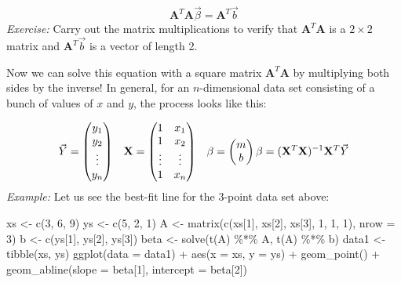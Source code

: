 \documentclass[
  letterpaper,
  DIV=11,
  numbers=noendperiod]{scrreprt}
\newenvironment{Shaded}{\begin{snugshade}}{\end{snugshade}}
\newcommand{\AttributeTok}[1]{\textcolor[rgb]{0.40,0.45,0.13}{#1}}
\newcommand{\DecValTok}[1]{\textcolor[rgb]{0.68,0.00,0.00}{#1}}
\newcommand{\FunctionTok}[1]{\textcolor[rgb]{0.28,0.35,0.67}{#1}}
\newcommand{\NormalTok}[1]{\textcolor[rgb]{0.00,0.23,0.31}{#1}}
\newcommand{\OtherTok}[1]{\textcolor[rgb]{0.00,0.23,0.31}{#1}}
\newcommand{\SpecialCharTok}[1]{\textcolor[rgb]{0.37,0.37,0.37}{#1}}
\begin{document}
\[
\mathbf{A}^T \mathbf{A} \vec \beta = \mathbf{A}^T \vec b
\] \emph{Exercise:} Carry out the matrix multiplications to verify that
\(\mathbf{A}^T \mathbf{A}\) is a \(2 \times 2\) matrix and
\(\mathbf{A}^T \vec b\) is a vector of length 2.

Now we can solve this equation with a square matrix
\(\mathbf{A}^T \mathbf{A}\) by multiplying both sides by the inverse! In
general, for an \(n\)-dimensional data set consisting of a bunch of
values of \(x\) and \(y\), the process looks like this:

\[
\vec Y = \begin{pmatrix} y_1\\ y_2\\ \vdots \\ y_n \end{pmatrix} \;\;\; 
\mathbf{X} = \begin{pmatrix} 1 & x_1\\ 1 & x_2\\ \vdots & \vdots \\ 1 & x_n \end{pmatrix}
 \;\;\; 
\mathbf{\beta} = \begin{pmatrix} m \\ b \end{pmatrix} \\
\beta = (\mathbf{X}^{T} \mathbf{X})^{-1} \mathbf{X}^{T}\vec Y
\] \emph{Example:} Let us see the best-fit line for the 3-point data set
above:

\begin{Shaded}
\begin{Highlighting}[]
\NormalTok{xs }\OtherTok{\textless{}{-}} \FunctionTok{c}\NormalTok{(}\DecValTok{3}\NormalTok{, }\DecValTok{6}\NormalTok{, }\DecValTok{9}\NormalTok{)}
\NormalTok{ys }\OtherTok{\textless{}{-}} \FunctionTok{c}\NormalTok{(}\DecValTok{5}\NormalTok{, }\DecValTok{2}\NormalTok{, }\DecValTok{1}\NormalTok{)}
\NormalTok{A }\OtherTok{\textless{}{-}} \FunctionTok{matrix}\NormalTok{(}\FunctionTok{c}\NormalTok{(xs[}\DecValTok{1}\NormalTok{], xs[}\DecValTok{2}\NormalTok{], xs[}\DecValTok{3}\NormalTok{], }\DecValTok{1}\NormalTok{, }\DecValTok{1}\NormalTok{, }\DecValTok{1}\NormalTok{), }\AttributeTok{nrow =} \DecValTok{3}\NormalTok{)}
\NormalTok{b }\OtherTok{\textless{}{-}} \FunctionTok{c}\NormalTok{(ys[}\DecValTok{1}\NormalTok{], ys[}\DecValTok{2}\NormalTok{], ys[}\DecValTok{3}\NormalTok{])}
\NormalTok{beta }\OtherTok{\textless{}{-}} \FunctionTok{solve}\NormalTok{(}\FunctionTok{t}\NormalTok{(A) }\SpecialCharTok{\%*\%}\NormalTok{ A, }\FunctionTok{t}\NormalTok{(A) }\SpecialCharTok{\%*\%}\NormalTok{ b)}
\NormalTok{data1 }\OtherTok{\textless{}{-}} \FunctionTok{tibble}\NormalTok{(xs, ys)}
\FunctionTok{ggplot}\NormalTok{(}\AttributeTok{data =}\NormalTok{ data1) }\SpecialCharTok{+} 
  \FunctionTok{aes}\NormalTok{(}\AttributeTok{x =}\NormalTok{ xs, }\AttributeTok{y =}\NormalTok{ ys) }\SpecialCharTok{+} 
  \FunctionTok{geom\_point}\NormalTok{() }\SpecialCharTok{+} 
  \FunctionTok{geom\_abline}\NormalTok{(}\AttributeTok{slope =}\NormalTok{ beta[}\DecValTok{1}\NormalTok{], }\AttributeTok{intercept =}\NormalTok{ beta[}\DecValTok{2}\NormalTok{])}
\end{Highlighting}
\end{Shaded}
\end{document}
